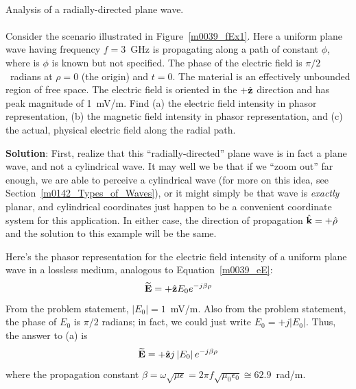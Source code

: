 ~\\ \begin{example} 
\begin{mdframed}[backgroundcolor=brown!20,linecolor=brown!20]\raggedright
Analysis of a radially-directed plane wave.
\\~\\
Consider the scenario illustrated in Figure~\ref{m0039_fEx1}.
Here a uniform plane wave having frequency $f=3$~GHz is propagating along a path of constant $\phi$, where is $\phi$ is known but not specified.  
The phase of the electric field is $\pi/2$~radians at $\rho=0$ (the origin) and $t=0$.
The material is an effectively unbounded region of free space.  
The electric field is oriented in the $+\hat{\bf z}$ direction and has peak magnitude of 1~mV/m.  
Find 
(a) the electric field intensity in phasor representation, 
(b) the magnetic field intensity in phasor representation, and 
(c) the actual, physical electric field along the radial path. 

{\bf Solution}: 
First, realize that this ``radially-directed'' plane wave is in fact a plane wave, and not a cylindrical wave.
It may well we be that if we ``zoom out'' far enough, we are able to perceive a cylindrical wave (for more on this idea, see Section~\ref{m0142_Types_of_Waves}), or it might simply be that wave is \emph{exactly} planar, and cylindrical coordinates just happen to be a convenient coordinate system for this application.
In either case, the direction of propagation $\hat{\bf k}=+\hat{\bf \rho}$ and the solution to this example will be the same.
 
Here's the phasor representation for the electric field intensity of a uniform plane wave in a lossless medium, analogous to Equation~\ref{m0039_eE}:
%
\begin{equation}
\widetilde{\bf E} = +\hat{\bf z}E_0 e^{-j\beta \rho} 
\end{equation}
%
From the problem statement, $\left|E_0\right| = 1$~mV/m.
Also from the problem statement, the phase of $E_0$ is $\pi/2$ radians; in fact, we could just write $E_0 = +j\left|E_0\right|$.
Thus, the answer to (a) is 
%
\begin{equation}
\widetilde{\bf E} = +\hat{\bf z}j\left|E_0\right| e^{-j\beta\rho}
\end{equation}
%
where the propagation constant $\beta = \omega\sqrt{\mu\epsilon} = 2\pi f \sqrt{\mu_0 \epsilon_0} \cong 62.9$~rad/m.  


\end{mdframed}
\end{example}
